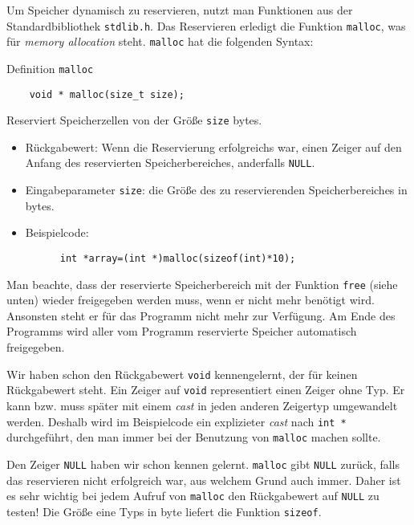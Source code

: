 Um Speicher dynamisch zu reservieren, nutzt man Funktionen aus der Standardbibliothek \verb|stdlib.h|.
Das Reservieren erledigt die Funktion \verb|malloc|, was für \emph{memory allocation} steht.
\verb|malloc| hat die folgenden Syntax:
\begin{myexampleblock}{Definition \texttt{malloc}}
  \begin{lstlisting}
    void * malloc(size_t size);
  \end{lstlisting}
  \vspace{-0.7cm}
  Reserviert Speicherzellen von der Größe \verb|size| bytes.
  \begin{itemize}
    \itemsep0.2pt
  \item Rückgabewert: Wenn die Reservierung erfolgreichs war, einen Zeiger auf den Anfang des
    reservierten Speicherbereiches, anderfalls \verb|NULL|.
  \item Eingabeparameter \verb|size|: die Größe des zu reservierenden Speicherbereiches in bytes.
  \item Beispielcode:
    \begin{lstlisting}
      int *array=(int *)malloc(sizeof(int)*10);
    \end{lstlisting}
  \end{itemize}
  \vspace{-0.7cm}
  Man beachte, dass der reservierte Speicherbereich mit der Funktion \verb|free| (siehe unten) wieder freigegeben werden muss, wenn er nicht mehr benötigt wird. 
  Ansonsten steht er für das Programm nicht mehr zur Verfügung.
  Am Ende des Programms wird aller vom Programm reservierte Speicher automatisch freigegeben.
\end{myexampleblock}
Wir haben schon den Rückgabewert \verb|void| kennengelernt, der für keinen Rückgabewert steht.
Ein Zeiger auf \verb|void| representiert einen Zeiger ohne Typ.
Er kann bzw. muss später mit einem \emph{cast} in jeden anderen Zeigertyp umgewandelt werden.
Deshalb wird im Beispielcode ein explizieter \emph{cast} nach \verb|int *| durchgeführt, den man immer bei der Benutzung von \verb|malloc| machen sollte.

Den Zeiger \verb|NULL| haben wir schon kennen gelernt. 
\verb|malloc| gibt \verb|NULL| zurück, falls das reservieren nicht erfolgreich war, aus welchem Grund auch immer.
Daher ist es sehr wichtig bei jedem Aufruf von \verb|malloc| den Rückgabewert auf \verb|NULL| zu testen!
Die Größe eine Typs in byte liefert die Funktion \verb|sizeof|.


